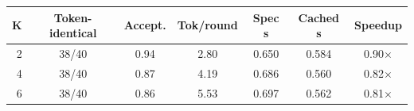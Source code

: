 \begin{tabular}{rcccccc}\toprule K & Token-identical & Accept. & Tok/round & Spec s & Cached s & Speedup\\\midrule
2 & 38/40 & 0.94 & 2.80 & 0.650 & 0.584 & 0.90$\times$\\
4 & 38/40 & 0.87 & 4.19 & 0.686 & 0.560 & 0.82$\times$\\
6 & 38/40 & 0.86 & 5.53 & 0.697 & 0.562 & 0.81$\times$\\
\bottomrule\end{tabular}